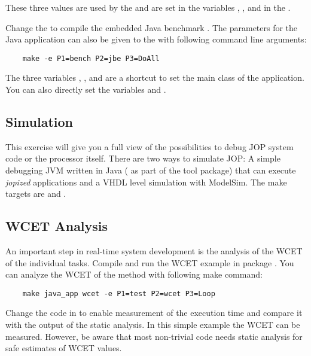 These three values are used by the  and are set in the
variables , , and  in the
.

Change the  to compile the embedded Java benchmark
. The parameters for the Java application can also
be given to the  with following command line arguments:
\begin{verbatim}
    make -e P1=bench P2=jbe P3=DoAll
\end{verbatim}

The three variables , , and  are a
shortcut to set the main class of the application. You can also
directly set the variables  and
.


\subsection{Simulation}

This  exercise will give you a full view of the possibilities to
debug JOP system code or the processor itself. There are two ways to
simulate JOP: A simple debugging JVM written in Java (
as part of the tool package) that can execute \emph{jopized}
applications and a VHDL level simulation with ModelSim. The make
targets are  and .

\subsection{WCET Analysis}

An important step in real-time system development is the analysis of
the WCET of the individual tasks. Compile and run the WCET example
 in package . You can analyze the WCET of
the method  with following make command:
\begin{verbatim}
    make java_app wcet -e P1=test P2=wcet P3=Loop
\end{verbatim}
Change the code in  to enable measurement of the
execution time and compare it with the output of the static analysis.
In this simple example the WCET can be measured. However, be aware
that most non-trivial code needs static analysis for safe estimates
of WCET values.
